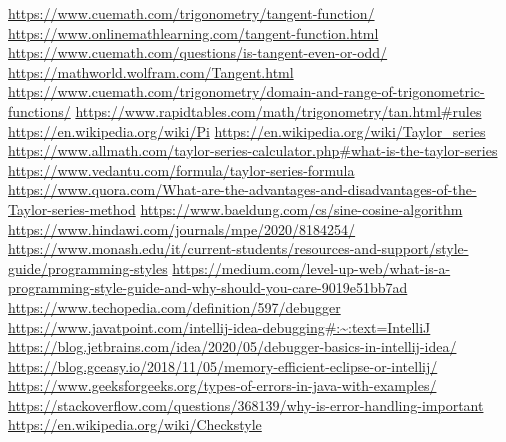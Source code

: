 \documentclass[12pt]{article}
\begin{document}
\begin{thebibliography}{9}
\url{https://www.cuemath.com/trigonometry/tangent-function/}
\url{https://www.onlinemathlearning.com/tangent-function.html}
\url{https://www.cuemath.com/questions/is-tangent-even-or-odd/}
\url{https://mathworld.wolfram.com/Tangent.html}
\url{https://www.cuemath.com/trigonometry/domain-and-range-of-trigonometric-functions/}
\url{https://www.rapidtables.com/math/trigonometry/tan.html#rules}
\url{https://en.wikipedia.org/wiki/Pi}
\url{https://en.wikipedia.org/wiki/Taylor_series}
\url{https://www.allmath.com/taylor-series-calculator.php#what-is-the-taylor-series}
\url{https://www.vedantu.com/formula/taylor-series-formula}
\url{https://www.quora.com/What-are-the-advantages-and-disadvantages-of-the-Taylor-series-method}
\url{https://www.baeldung.com/cs/sine-cosine-algorithm}
\url{https://www.hindawi.com/journals/mpe/2020/8184254/}
\url{https://www.monash.edu/it/current-students/resources-and-support/style-guide/programming-styles}
\url{https://medium.com/level-up-web/what-is-a-programming-style-guide-and-why-should-you-care-9019e51bb7ad}
\url{https://www.techopedia.com/definition/597/debugger}
\url{https://www.javatpoint.com/intellij-idea-debugging#:~:text=IntelliJ}
\url{https://blog.jetbrains.com/idea/2020/05/debugger-basics-in-intellij-idea/}
\url{https://blog.gceasy.io/2018/11/05/memory-efficient-eclipse-or-intellij/}
\url{https://www.geeksforgeeks.org/types-of-errors-in-java-with-examples/}
\url{https://stackoverflow.com/questions/368139/why-is-error-handling-important}
\url{https://en.wikipedia.org/wiki/Checkstyle}

\end{thebibliography}

    
    
\end{document}
